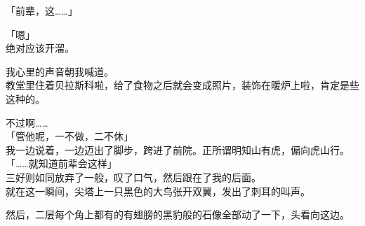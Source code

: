 「前辈，这……」

「嗯」\\

绝对应该开溜。

我心里的声音朝我喊道。\\

教堂里住着贝拉斯科啦，给了食物之后就会变成照片，装饰在暖炉上啦，肯定是些这种的。

不过啊……\\

「管他呢，一不做，二不休」\\

我一边说着，一边迈出了脚步，跨进了前院。正所谓明知山有虎，偏向虎山行。\\

「……就知道前辈会这样」\\

三好则如同放弃了一般，叹了口气，然后跟在了我的后面。\\

就在这一瞬间，尖塔上一只黑色的大鸟张开双翼，发出了刺耳的叫声。

然后，二层每个角上都有的有翅膀的黑豹般的石像全部动了一下，头看向这边。\\

